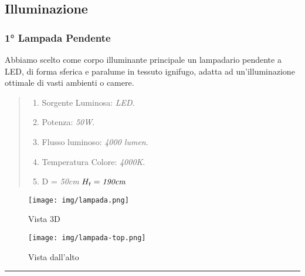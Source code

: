 \documentclass[italian, 12pt, a4paper]{article}
\begin{document}
\subsection{Illuminazione}
\subsubsection{1° Lampada Pendente}
Abbiamo scelto come corpo illuminante principale un lampadario pendente a LED, di forma sferica e paralume in tessuto ignifugo, adatta ad un'illuminazione ottimale di vasti ambienti o camere.
\begin{quote}
    \begin{enumerate}
        \item Sorgente Luminosa: \emph{LED}.
        \item Potenza: \emph{50W}.
        \item Flusso luminoso: \emph{4000 lumen}.
        \item Temperatura Colore: \emph{4000K}.
        \item D = \emph{50cm} $H_t = \emph{190cm}$
    \end{enumerate}
\end{quote}
\begin{figure}[h!]
    \centering
    \begin{minipage}{0.45\textwidth}
        \centering
        \texttt{[image: img/lampada.png]}
        \caption{Vista 3D}
    \end{minipage} \hfill
    \begin{minipage}{0.45\textwidth}
        \centering
        \texttt{[image: img/lampada-top.png]}
        \caption{Vista dall'alto}
    \end{minipage}
\end{figure}
\hrule
\end{document}
